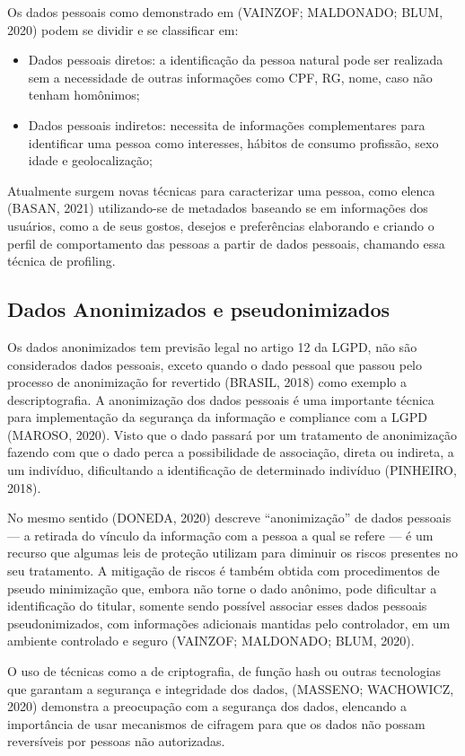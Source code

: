 \documentclass[
	12pt,				%
	openright,			%
	oneside,			%
	a4paper,			%
	english,			%
	french,				%
	spanish,			%
	brazil,				%
	]{abntex2}
\begin{document}
Os dados pessoais como demonstrado em (VAINZOF; MALDONADO; BLUM, 2020) podem se dividir e se classificar em:
\begin{itemize}
\item Dados pessoais diretos: a identificação da pessoa natural pode ser realizada sem a necessidade de outras informações como CPF, RG, nome, caso não tenham homônimos;
\item Dados pessoais indiretos: necessita de informações complementares para identificar uma pessoa como interesses, hábitos de consumo profissão, sexo idade e geolocalização;
\end{itemize}

Atualmente surgem novas técnicas para caracterizar uma pessoa, como elenca  (BASAN, 2021) utilizando-se de metadados baseando se em informações dos usuários, como a de seus gostos, desejos e preferências elaborando e criando o perfil de comportamento das pessoas a partir de dados pessoais, chamando essa técnica de profiling.

\subsection{Dados Anonimizados e pseudonimizados}

Os dados anonimizados tem previsão legal no artigo 12 da LGPD, não são considerados dados pessoais, exceto quando o dado pessoal que passou pelo processo de anonimização for revertido (BRASIL, 2018)  como exemplo a descriptografia. A anonimização dos dados pessoais é uma importante técnica para implementação da segurança da informação e compliance com a LGPD (MAROSO, 2020). Visto que o dado passará por um tratamento de anonimização fazendo com que o dado perca a possibilidade de associação, direta ou indireta, a um indivíduo, dificultando a identificação de determinado indivíduo  (PINHEIRO, 2018).

No mesmo sentido (DONEDA, 2020) descreve “anonimização” de dados pessoais — a retirada do vínculo da informação com a pessoa a qual se refere — é um recurso que algumas leis de proteção utilizam para diminuir os riscos presentes no seu tratamento. A mitigação de riscos é também obtida com procedimentos de pseudo minimização que, embora não torne o dado anônimo, pode dificultar a identificação do titular, somente sendo possível associar esses dados pessoais pseudonimizados, com informações adicionais mantidas pelo controlador, em um ambiente controlado e seguro (VAINZOF; MALDONADO; BLUM, 2020).

O uso de técnicas como a de criptografia, de função hash ou outras tecnologias que garantam a segurança e integridade dos dados, (MASSENO; WACHOWICZ, 2020) demonstra a preocupação com a segurança dos dados, elencando a importância de usar mecanismos de cifragem para que os dados não possam reversíveis por pessoas não autorizadas.
\end{document}
